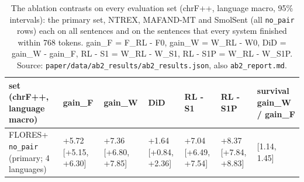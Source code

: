 \begin{table}[t]
\centering
\footnotesize
\setlength{\tabcolsep}{3pt}
\caption{The ablation contrasts on every evaluation set (chrF++, language macro, 95\% intervals): the primary set, NTREX, MAFAND-MT and SmolSent (all \texttt{no\_pair} rows) each on all sentences and on the sentences that every system finished within 768 tokens. gain\_F = F\_RL - F0, gain\_W = W\_RL - W0, DiD = gain\_W - gain\_F, RL - S1 = W\_RL - W\_S1, RL - S1P = W\_RL - W\_S1P. Source: \texttt{paper/data/ab2\_results/ab2\_results.json}, also \texttt{ab2\_report.md}.}
\label{tab:t_ablation_sets}
{\def\LTcaptype{none} %
\begin{tabular}{@{}
  >{\raggedright\arraybackslash}p{}
  >{\raggedleft\arraybackslash}p{}
  >{\raggedleft\arraybackslash}p{}
  >{\raggedleft\arraybackslash}p{}
  >{\raggedleft\arraybackslash}p{}
  >{\raggedleft\arraybackslash}p{}
  >{\raggedleft\arraybackslash}p{}@{}}
\toprule
\begin{minipage}[b]{\linewidth}\raggedright
set (chrF++, language macro)
\end{minipage} & \begin{minipage}[b]{\linewidth}\raggedleft
gain\_F
\end{minipage} & \begin{minipage}[b]{\linewidth}\raggedleft
gain\_W
\end{minipage} & \begin{minipage}[b]{\linewidth}\raggedleft
DiD
\end{minipage} & \begin{minipage}[b]{\linewidth}\raggedleft
RL - S1
\end{minipage} & \begin{minipage}[b]{\linewidth}\raggedleft
RL - S1P
\end{minipage} & \begin{minipage}[b]{\linewidth}\raggedleft
survival gain\_W / gain\_F
\end{minipage} \\
\midrule
FLORES+ \texttt{no\_pair} (primary; 4 languages) & +5.72 {[}+5.15, +6.30{]} & +7.36 {[}+6.80, +7.85{]} & +1.64 {[}+0.84, +2.36{]} & +7.04 {[}+6.49, +7.54{]} & +8.37 {[}+7.84, +8.83{]} & 1.29 {[}1.14, 1.45{]} \\

\end{tabular}}
\end{table}
